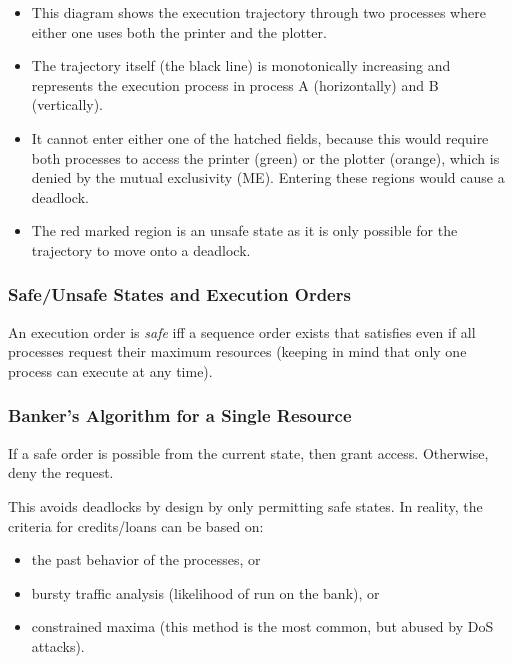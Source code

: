 	            \begin{itemize}
	            	\item This diagram shows the execution trajectory through two processes where either one uses both the printer and the plotter.
	            	\item The trajectory itself (the black line) is monotonically increasing and represents the execution process in process A (horizontally) and B (vertically).
	            	\item It cannot enter either one of the hatched fields, because this would require both processes to access the printer (green) or the plotter (orange), which is denied by the mutual exclusivity (ME). Entering these regions would cause a deadlock.
	            	\item The red marked region is an unsafe state as it is only possible for the trajectory to move onto a deadlock.
	            \end{itemize}
            
            \subsubsection{Safe/Unsafe States and Execution Orders}
				An execution order is \textit{safe} iff a sequence order exists that satisfies even if all processes request their maximum resources (keeping in mind that only one process can execute at any time).

            \subsubsection{Banker's Algorithm for a Single Resource}
                If a safe order is possible from the current state, then grant access. Otherwise, deny the request.
                
                This avoids deadlocks by design by only permitting safe states. In reality, the criteria for credits/loans can be based on:
                \begin{itemize}
                	\item the past behavior of the processes, or
                	\item bursty traffic analysis (likelihood of run on the bank), or
                	\item constrained maxima (this method is the most common, but abused by DoS attacks).
                \end{itemize}


